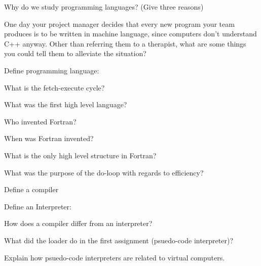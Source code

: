 \documentclass{exam} %
\begin{document}
\begin{questions}

  \question Why do we study programming languages? (Give three reasons)

  \question One day your project manager decides that every new program your team produces is to be written in machine language, since computers don't understand C++ anyway. Other than referring them to a therapist, what are some things you could tell them to alleviate the situation?

  \question Define programming language:

  \question What is the fetch-execute cycle?

  \question What was the first high level language?

  \question Who invented Fortran?

  \question When was Fortran invented?

  \question What is the only high level structure in Fortran?

  \question What was the purpose of the do-loop with regards to efficiency?

  \question Define a compiler

  \pagebreak

  \question Define an Interpreter:

  \question How does a compiler differ from an interpreter?

  \question What did the loader do in the first assignment (psuedo-code interpreter)?

  \question Explain how psuedo-code interpreters are related to virtual computers.


\end{questions}
\end{document}
